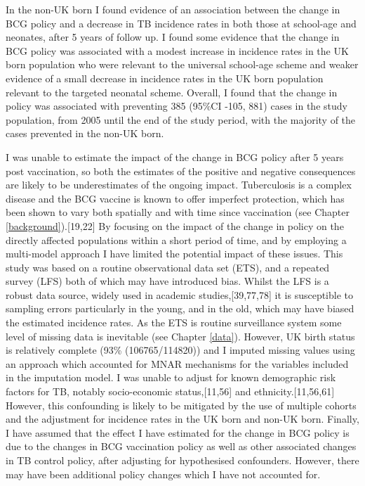 \documentclass[11pt,twoside]{bristolthesis}
\begin{document}
  In the non-UK born I found evidence of an association between the change in BCG policy and a decrease in TB incidence rates in both those at school-age and neonates, after 5 years of follow up. I found some evidence that the change in BCG policy was associated with a modest increase in incidence rates in the UK born population who were relevant to the universal school-age scheme and weaker evidence of a small decrease in incidence rates in the UK born population relevant to the targeted neonatal scheme. Overall, I found that the change in policy was associated with preventing 385 (95\%CI -105, 881) cases in the study population, from 2005 until the end of the study period, with the majority of the cases prevented in the non-UK born.
  
  I was unable to estimate the impact of the change in BCG policy after 5 years post vaccination, so both the estimates of the positive and negative consequences are likely to be underestimates of the ongoing impact. Tuberculosis is a complex disease and the BCG vaccine is known to offer imperfect protection, which has been shown to vary both spatially and with time since vaccination (see Chapter \ref{background}).{[}19,22{]} By focusing on the impact of the change in policy on the directly affected populations within a short period of time, and by employing a multi-model approach I have limited the potential impact of these issues. This study was based on a routine observational data set (ETS), and a repeated survey (LFS) both of which may have introduced bias. Whilst the LFS is a robust data source, widely used in academic studies,{[}39,77,78{]} it is susceptible to sampling errors particularly in the young, and in the old, which may have biased the estimated incidence rates. As the ETS is routine surveillance system some level of missing data is inevitable (see Chapter \ref{data}). However, UK birth status is relatively complete (93\% (106765/114820)) and I imputed missing values using an approach which accounted for MNAR mechanisms for the variables included in the imputation model. I was unable to adjust for known demographic risk factors for TB, notably socio-economic status,{[}11,56{]} and ethnicity.{[}11,56,61{]} However, this confounding is likely to be mitigated by the use of multiple cohorts and the adjustment for incidence rates in the UK born and non-UK born. Finally, I have assumed that the effect I have estimated for the change in BCG policy is due to the changes in BCG vaccination policy as well as other associated changes in TB control policy, after adjusting for hypothesised confounders. However, there may have been additional policy changes which I have not accounted for.
  
\end{document}
